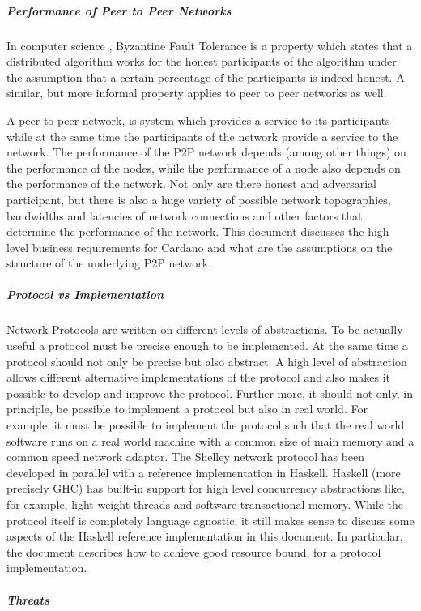 \documentclass{report}
\newcommand{\wip}[1]{\color{magenta}{#1}\color{black}}
\theoremstyle{definition}{
  \newtheorem{lemma}{Lemma}[section] %
  \newtheorem{definition}[lemma]{Definition}
}
\theoremstyle{theorem}{
  \newtheorem{invariant}[lemma]{Invariant}
  \newtheorem{proofobligation}[lemma]{Proof Obligation}
}
\numberwithin{equation}{lemma}
\begin{document}

\subparagraph{Performance of Peer to Peer Networks}
In computer science , Byzantine Fault Tolerance is a property which states
that a distributed algorithm works for the honest participants of the algorithm
under the assumption that a certain percentage of the participants is indeed honest.
A similar, but more informal property applies to peer to peer networks as well.

A peer to peer network, is system which provides a service to its participants while at the same
time the participants of the network provide a service to the network.
The performance of the P2P network depends (among other things) on the performance of the nodes,
while the performance of a node also depends on the performance of the network.
Not only are there honest and adversarial participant, but there is also a huge variety of
possible network topographies, bandwidths and latencies of network connections and other
factors that determine the performance of the network.
This document discusses the high level business requirements for Cardano and what are the
assumptions on the structure of the underlying P2P network.

\subparagraph{Protocol vs Implementation}
Network Protocols are written on different levels of abstractions.
To be actually useful a protocol must be precise enough to be implemented.
At the same time a protocol should not only be precise but also abstract.
A high level of abstraction allows different alternative implementations of the protocol
and also makes it possible to develop and improve the protocol.
Further more, it should not only, in principle, be possible to implement a protocol
but also in real world.
For example, it must be possible to implement the protocol
such that the real world software runs on a real world machine with a common size of main memory
and a common speed network adaptor.
The Shelley network protocol has been developed in parallel with a reference implementation in Haskell.
Haskell (more precisely GHC) has built-in support for high level concurrency abstractions
like, for example, light-weight threads and software transactional memory.
While the protocol itself is completely language agnostic, it still makes sense to discuss some
aspects of the Haskell reference implementation in this document.
In particular, the document describes how to achieve good resource bound, for a protocol implementation.

\subparagraph{Threats}
\wip{Reference the Threats section.
  'eclipse' can be detered}
\end{document}
